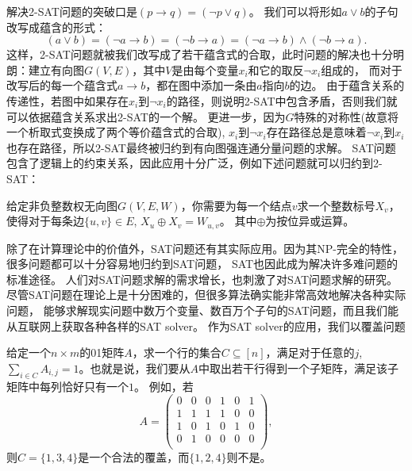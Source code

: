 解决2-SAT问题的突破口是$(p\to q) = (\neg p \lor q)$。
我们可以将形如$a\lor b$的子句改写成蕴含的形式：$$(a\lor b) = (\neg a \to b) = (\neg b \to a) = (\neg a \to b) \land (\neg b \to a).$$
这样，2-SAT问题就被我们改写成了若干蕴含式的合取，此时问题的解决也十分明朗：建立有向图$G(V,E)$，其中$V$是由每个变量$x_i$和它的取反$\neg x_i$组成的，
而对于改写后的每一个蕴含式$a\to b$，都在图中添加一条由$a$指向$b$的边。
由于蕴含关系的传递性，若图中如果存在$x_i$到$\neg x_i$的路径，则说明2-SAT中包含矛盾，否则我们就可以依据蕴含关系求出2-SAT的一个解。
更进一步，因为$G$特殊的对称性(故意将一个析取式变换成了两个等价蕴含式的合取), $x_i$到$\neg x_i$存在路径总是意味着$\neg x_i$到$x_i$也存在路径，所以2-SAT最终被归约到有向图强连通分量问题的求解。
SAT问题包含了逻辑上的约束关系，因此应用十分广泛，例如下述问题就可以归约到2-SAT：
\begin{prob}
 给定非负整数权无向图$G(V, E, W)$，你需要为每一个结点$v$求一个整数标号$X_v$，使得对于每条边$\{u, v\}\in E$, $X_u \oplus X_v = W_{u,v}$。
 其中$\oplus$为按位异或运算。
\end{prob}

除了在计算理论中的价值外，SAT问题还有其实际应用。因为其NP-完全的特性，很多问题都可以十分容易地归约到SAT问题，
SAT也因此成为解决许多难问题的标准途径。
人们对SAT问题求解的需求增长，也刺激了对SAT问题求解的研究。尽管SAT问题在理论上是十分困难的，但很多算法确实能非常高效地解决各种实际问题，
能够求解现实问题中数万个变量、数百万个子句的SAT问题，而且我们能从互联网上获取各种各样的SAT solver。
作为SAT solver的应用，我们以覆盖问题

\begin{prob}
 给定一个$n\times m$的01矩阵$A$，求一个行的集合$C\subseteq[n]$，满足对于任意的$j$, 
 $\sum_{i\in C} A_{i,j} = 1$。也就是说，我们要从$A$中取出若干行得到一个子矩阵，满足该子矩阵中每列恰好只有一个$1$。
 例如，若
 $$A = 
 \begin{pmatrix}
  0 & 0 & 0 & 1 & 0 & 1\\
  1 & 1 & 1 & 1 & 0 & 0\\
  1 & 0 & 1 & 0 & 1 & 0\\
  0 & 1 & 0 & 0 & 0 & 0\\
 \end{pmatrix},
 $$
 则$C=\{1, 3, 4\}$是一个合法的覆盖，而$\{1, 2, 4\}$则不是。
\end{prob}


